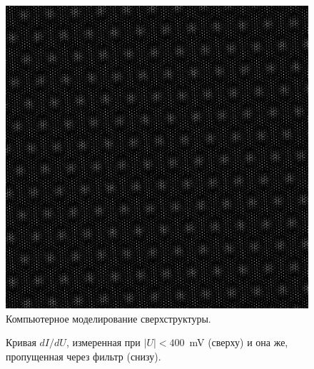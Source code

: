 \documentclass[a4paper, 12pt]{article}
\begin{document}
	\begin{figure}[H]
		\centering
		\includegraphics[width=0.9\linewidth]{../STM_data/Muar/Muar_model}
		\caption{Компьютерное моделирование сверхструктуры.}
		\label{fig:2_muar_model}
	\end{figure}
	
	\begin{figure}[H]
		\centering
		\caption{Кривая $dI/dU$, измеренная при $|U| < 400$~mV (сверху) и она же, пропущенная через фильтр (снизу).}
		\label{fig:3_STS}
	\end{figure}
	
\end{document}
